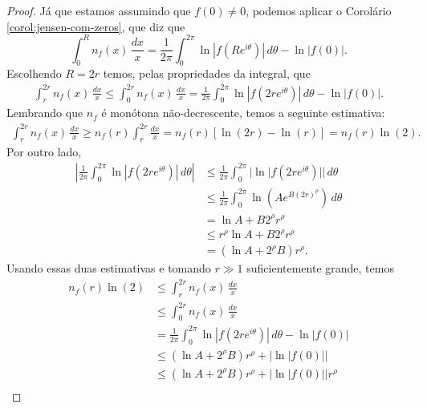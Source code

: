 \begin{proof}
       Já que estamos assumindo que $f(0) \neq 0$, podemos aplicar o 
       Corolário \ref{corol:jensen-com-zeros}, que diz que
       \begin{equation*}
           \int_0^R n_f(x) \, \frac{dx}{x} 
           = \frac{1}{2\pi} \int_0^{2\pi} \ln|f(Re^{i\theta})| \, d\theta - \ln|f(0)|.
       \end{equation*}
       Escolhendo $R = 2r$ temos, pelas propriedades da integral, que
       \begin{align*}
           \int_r^{2r} n_f(x) \, \frac{dx}{x}
           \leq \int_0^{2r} n_f(x) \, \frac{dx}{x}
           = \frac{1}{2\pi} \int_0^{2\pi} \ln|f(2re^{i\theta})| \, d\theta - \ln|f(0)|.
       \end{align*}
       Lembrando que $n_f$ é monótona não-decrescente, temos a seguinte estimativa:
       \begin{align*}
           \int_r^{2r} n_f(x) \, \frac{dx}{x}
           \geq n_f(r) \int_r^{2r} \frac{dx}{x} 
           = n_f(r)[\ln(2r) - \ln(r)]
           = n_f(r)\ln(2).
       \end{align*}
       Por outro lado,
       \begin{align*}
           \left| \frac{1}{2\pi} \int_0^{2\pi} \ln|f(2re^{i\theta})| \, d\theta \right|
           &\leq \frac{1}{2\pi} \int_0^{2\pi} |\ln|f(2re^{i\theta})| | \, d\theta \\
           &\leq \frac{1}{2\pi} \int_0^{2\pi} \ln\left(Ae^{B(2r)^{\rho}}\right) 
           \, d\theta \\
           &= \ln A + B2^{\rho}r^{\rho} \\
           &\leq r^{\rho}\ln A + B2^{\rho}r^{\rho} \\
           &= (\ln A + 2^{\rho}B)r^{\rho}.
       \end{align*}
       Usando essas duas estimativas e tomando $r\gg 1$ suficientemente grande,
       temos
       \begin{align*}
           n_f(r)\ln(2) &\leq \int_r^{2r} n_f(x) \, \frac{dx}{x} \\
                        &\leq \int_0^{2r} n_f(x) \, \frac{dx}{x} \\
                        &= \frac{1}{2\pi}\int_0^{2\pi} \ln|f(2re^{i\theta})| \, d\theta
                        - \ln|f(0)| \\
                        &\leq (\ln A + 2^{\rho}B)r^{\rho} + |\ln|f(0)|| \\
                        &\leq (\ln A + 2^{\rho}B)r^{\rho} + |\ln|f(0)||r^{\rho} \\

\end{align*}
\end{proof}
